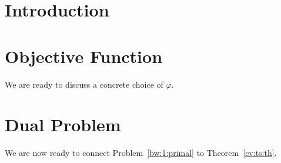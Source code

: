 \section{Introduction}


\section{Objective Function}

We are ready to discuss a concrete choice of $\varphi$.


\newpage 
\section{Dual Problem}
We are now ready to connect 
Problem~\ref{bw:1:primal} to Theorem~\ref{cv:ts:th}.




%
%

